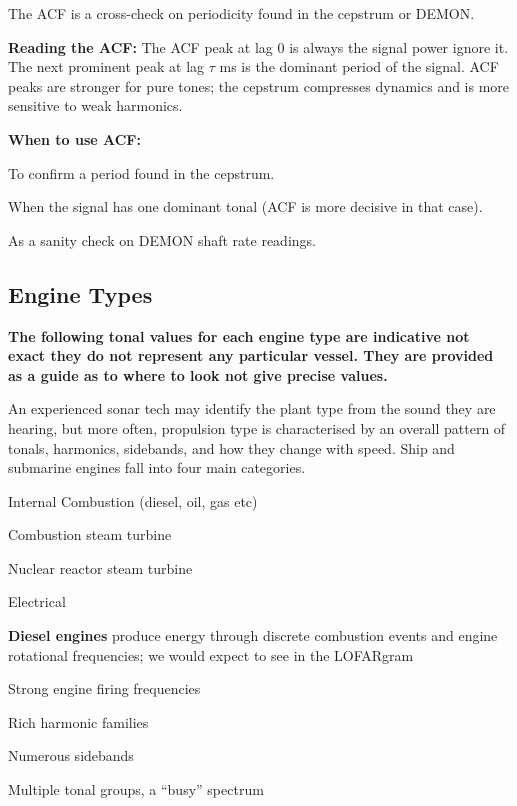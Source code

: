 The ACF is a cross-check on periodicity found in the cepstrum or DEMON.

\textbf{Reading the ACF:} The ACF peak at lag 0 is always the signal power ignore it. The next prominent peak at lag $\tau$ ms is the dominant period of the signal. ACF peaks are stronger for pure tones; the cepstrum compresses dynamics and is more sensitive to weak harmonics.

\textbf{When to use ACF:}
\begin{compactitem}
\item To confirm a period found in the cepstrum.
\item When the signal has one dominant tonal (ACF is more decisive in that case).
\item As a sanity check on DEMON shaft rate readings.
\end{compactitem}

\subsection{Engine Types}

\textbf{The following tonal values for each engine type are indicative not exact they do not represent any particular vessel. They are provided as a guide as to where to look not give precise values.}

An experienced sonar tech may identify the plant type from the sound they are hearing, but more often, propulsion type is characterised by an overall pattern of tonals, harmonics, sidebands, and how they change with speed.  Ship and submarine engines fall into four main categories.

\begin{compactitem}
    \item Internal Combustion (diesel, oil, gas etc)
    \item Combustion steam turbine
    \item Nuclear reactor steam turbine
    \item Electrical
\end{compactitem}

\textbf{Diesel engines} produce energy through discrete combustion events and engine rotational frequencies; we would expect to see in the LOFARgram

\begin{compactitem}
    \item Strong engine firing frequencies
    \item Rich harmonic families
    \item Numerous sidebands
    \item Multiple tonal groups, a “busy” spectrum
\end{compactitem}

